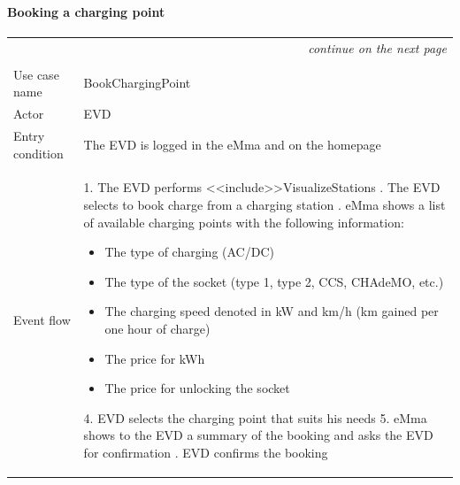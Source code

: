 \paragraph{Booking a charging point}
\begin{center}
    \begin{longtable}{p{4cm} p{11cm}}
    \multicolumn{2}{r}{\itshape{continue on the next page}}\\
    \endfoot 
    \\
    \endlastfoot
    \hline
     Use case name &  BookChargingPoint\\
     \hline
     Actor & EVD \\
     \hline
     Entry condition &   The EVD is logged in the eMma and on the homepage\\
     \hline
     Event flow &
        1. The EVD performs <<include>>VisualizeStations \newline
        2. The EVD selects to book charge from a charging station \newline
        3. eMma shows a list of available charging points with the following information:
            \begin{adjustwidth}{0.5cm}{}
                \begin{itemize}
                    \item The type of charging (AC/DC)
                    \item The type of the socket (type 1, type 2, CCS, CHAdeMO, etc.)
                    \item The charging speed denoted in kW and km/h (km gained per one hour of charge)
                    \item The price for kWh
                    \item The price for unlocking the socket
                \end{itemize}
            \end{adjustwidth}
        4. EVD selects the charging point that suits his needs \newline
        5. eMma shows to the EVD a summary of the booking and asks the EVD for confirmation \newline
        6. EVD confirms the booking \newline

\end{longtable}
\end{center}
